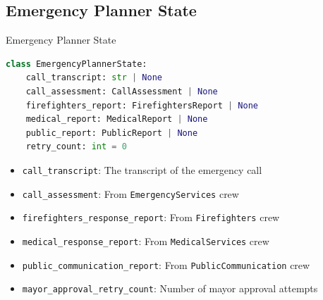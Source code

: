 \subsection{Emergency Planner State}
\begin{frame}[fragile]{Emergency Planner State}
    \begin{lstlisting}[language=Python]
class EmergencyPlannerState:
    call_transcript: str | None
    call_assessment: CallAssessment | None
    firefighters_report: FirefightersReport | None
    medical_report: MedicalReport | None
    public_report: PublicReport | None
    retry_count: int = 0
    \end{lstlisting}
\begin{itemize}
    \item \texttt{call\_transcript}: The transcript of the emergency call
    \item \texttt{call\_assessment}: From \texttt{EmergencyServices} crew
    \item \texttt{firefighters\_response\_report}: From \texttt{Firefighters} crew
    \item \texttt{medical\_response\_report}: From \texttt{MedicalServices} crew
    \item \texttt{public\_communication\_report}: From \texttt{PublicCommunication} crew
    \item \texttt{mayor\_approval\_retry\_count}: Number of mayor approval attempts
\end{itemize}
\end{frame}
